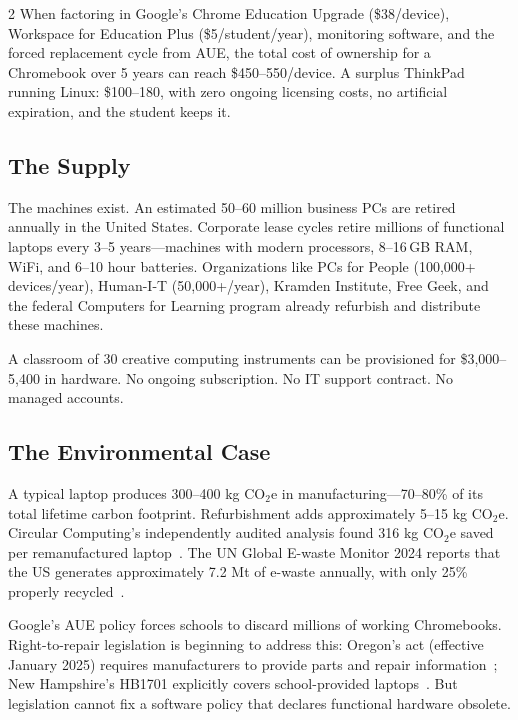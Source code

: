 \documentclass[11pt, a4paper]{article}
\begin{document}
\begin{multicols}{2}
When factoring in Google's Chrome Education Upgrade (\$38/device), Workspace for Education Plus (\$5/student/year), monitoring software, and the forced replacement cycle from AUE, the total cost of ownership for a Chromebook over 5 years can reach \$450--550/device. A surplus ThinkPad running Linux: \$100--180, with zero ongoing licensing costs, no artificial expiration, and the student keeps it.

\subsection{The Supply}

The machines exist. An estimated 50--60 million business PCs are retired annually in the United States. Corporate lease cycles retire millions of functional laptops every 3--5 years---machines with modern processors, 8--16\,GB RAM, WiFi, and 6--10 hour batteries. Organizations like PCs for People (100,000+ devices/year), Human-I-T (50,000+/year), Kramden Institute, Free Geek, and the federal Computers for Learning program already refurbish and distribute these machines.

A classroom of 30 creative computing instruments can be provisioned for \$3,000--5,400 in hardware. No ongoing subscription. No IT support contract. No managed accounts.

\subsection{The Environmental Case}

A typical laptop produces 300--400 kg CO$_2$e in manufacturing---70--80\% of its total lifetime carbon footprint. Refurbishment adds approximately 5--15 kg CO$_2$e. Circular Computing's independently audited analysis found 316 kg CO$_2$e saved per remanufactured laptop~\citep{circularcomputing2023carbon}. The UN Global E-waste Monitor 2024 reports that the US generates approximately 7.2 Mt of e-waste annually, with only 25\% properly recycled~\citep{un2024ewaste}.

Google's AUE policy forces schools to discard millions of working Chromebooks. Right-to-repair legislation is beginning to address this: Oregon's act (effective January 2025) requires manufacturers to provide parts and repair information~\citep{oregon2024repair}; New Hampshire's HB1701 explicitly covers school-provided laptops~\citep{newhampshire2024repair}. But legislation cannot fix a software policy that declares functional hardware obsolete.


\end{multicols}
\end{document}
